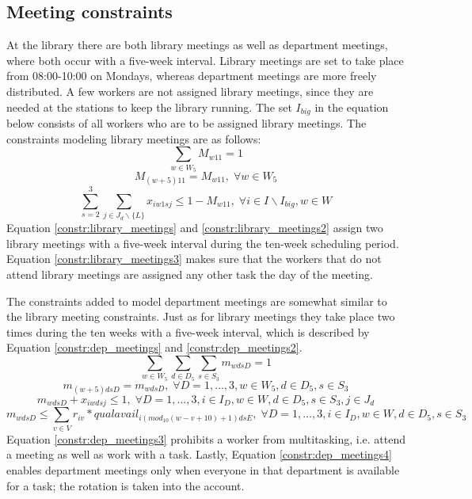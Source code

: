 \subsection{Meeting constraints} \label{section:meeting_constraints}
At the library there are both library meetings as well as department meetings, where both occur with a five-week interval. Library meetings are set to take place from 08:00-10:00 on Mondays, whereas department meetings are more freely distributed. A few workers are not assigned library meetings, since they are needed at the stations to keep the library running. The set $I_{big}$ in the equation below consists of all workers who are to be assigned library meetings. The constraints modeling library meetings are as follows:
\begin{equation} \label{constr:library_meetings}
\sum_{w \in W_5} M_{w11} = 1
\end{equation}
\begin{equation} \label{constr:library_meetings2}
M_{(w+5)11} = M_{w11}, \; \forall w \in W_5
\end{equation}
\begin{equation} \label{constr:library_meetings3}
\sum_{s=2}^{3} \sum_{j \in J_d \backslash \{L\}} x_{iw1sj} \leq 1-M_{w11}, \; \forall i \in I \backslash I_{big}, w \in W
\end{equation}
Equation \ref{constr:library_meetings} and \ref{constr:library_meetings2} assign two library meetings with a five-week interval during the ten-week scheduling period. Equation \ref{constr:library_meetings3} makes sure that the workers that do not attend library meetings are assigned any other task the day of the meeting.

The constraints added to model department meetings are somewhat similar to the library meeting constraints. Just as for library meetings they take place two times during the ten weeks with a five-week interval, which is described by Equation \ref{constr:dep_meetings} and \ref{constr:dep_meetings2}.
\begin{equation} \label{constr:dep_meetings}
\sum_{w \in W_5}\sum_{d \in D_5}\sum_{s \in S_3} m_{wdsD} = 1
\end{equation}
\begin{equation} \label{constr:dep_meetings2}
m_{(w+5)dsD} = m_{wdsD}, \; \forall D = 1, \ldots, 3, w \in W_5, d \in D_5, s \in S_3
\end{equation}
\begin{equation} \label{constr:dep_meetings3}
m_{wdsD} + x_{iwdsj} \leq 1, \; \forall D = 1, \ldots, 3, i \in I_D, w \in W, d \in D_5, s \in S_3, j \in J_d
\end{equation}
\begin{equation} \label{constr:dep_meetings4}
m_{wdsD} \leq \sum_{v \in V} r_{iv}*qualavail_{i(mod_{10}(w-v+10)+1)dsE}, \; \forall D = 1, \ldots, 3, i \in I_D, w \in W, d \in D_5, s \in S_3
\end{equation}
Equation \ref{constr:dep_meetings3} prohibits a worker from multitasking, i.e. attend a meeting as well as work with a task. Lastly, Equation \ref{constr:dep_meetings4} enables department meetings only when everyone in that department is available for a task; the rotation is taken into the account.

